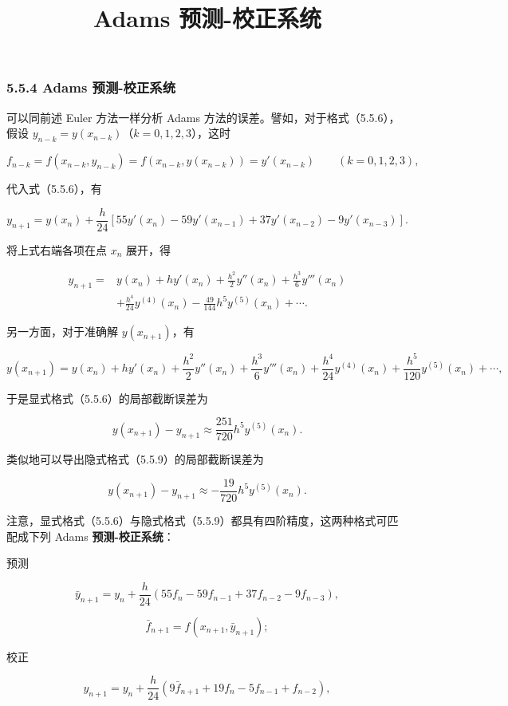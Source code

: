 \documentclass[
  10pt,
  fontset=fandol]{ctexart}
\title{Adams 预测-校正系统}
\author{}
\date{}
\begin{document}
\maketitle

\subsubsection{5.5.4 Adams 预测-校正系统}\label{adams-ux9884ux6d4b-ux6821ux6b63ux7cfbux7edf}

可以同前述 Euler 方法一样分析 Adams 方法的误差。譬如，对于格式（5.5.6），假设 \(y_{n-k}=y(x_{n-k})\)（\(k=0,1,2,3\)），这时

\[
f_{n-k}=f(x_{n-k},y_{n-k})=f(x_{n-k},y(x_{n-k}))=y'(x_{n-k})\qquad(k=0,1,2,3),
\]

代入式（5.5.6），有

\[
y_{n+1}=y(x_n)+\frac h{24}[55y'(x_n)-59y'(x_{n-1})+37y'(x_{n-2})-9y'(x_{n-3})].
\]

将上式右端各项在点 \(x_n\) 展开，得

\[
\begin{aligned}
y_{n+1}={}&y(x_n)+hy'(x_n)+\frac{h^2}{2}y''(x_n)+\frac{h^3}{6}y'''(x_n)\\
&+\frac{h^4}{24}y^{(4)}(x_n)-\frac{49}{144}h^5y^{(5)}(x_n)+\cdots.
\end{aligned}
\]

另一方面，对于准确解 \(y(x_{n+1})\)，有

\[
y(x_{n+1})=y(x_n)+hy'(x_n)+\frac{h^2}{2}y''(x_n)+\frac{h^3}{6}y'''(x_n)+\frac{h^4}{24}y^{(4)}(x_n)+\frac{h^5}{120}y^{(5)}(x_n)+\cdots,
\]

于是显式格式（5.5.6）的局部截断误差为

\[
y(x_{n+1})-y_{n+1}\approx\frac{251}{720}h^5y^{(5)}(x_n).
\tag{5.5.10}
\]

类似地可以导出隐式格式（5.5.9）的局部截断误差为

\[
y(x_{n+1})-y_{n+1}\approx-\frac{19}{720}h^5y^{(5)}(x_n).
\tag{5.5.11}
\]

注意，显式格式（5.5.6）与隐式格式（5.5.9）都具有四阶精度，这两种格式可匹配成下列 Adams \textbf{预测-校正系统}：

预测

\[
\bar y_{n+1}=y_n+\frac h{24}(55f_n-59f_{n-1}+37f_{n-2}-9f_{n-3}),
\tag{5.5.12}
\]

\[
\bar f_{n+1}=f(x_{n+1},\bar y_{n+1});
\]

校正

\[
y_{n+1}=y_n+\frac h{24}(9\bar f_{n+1}+19f_n-5f_{n-1}+f_{n-2}),
\tag{5.5.13}
\]
\end{document}
